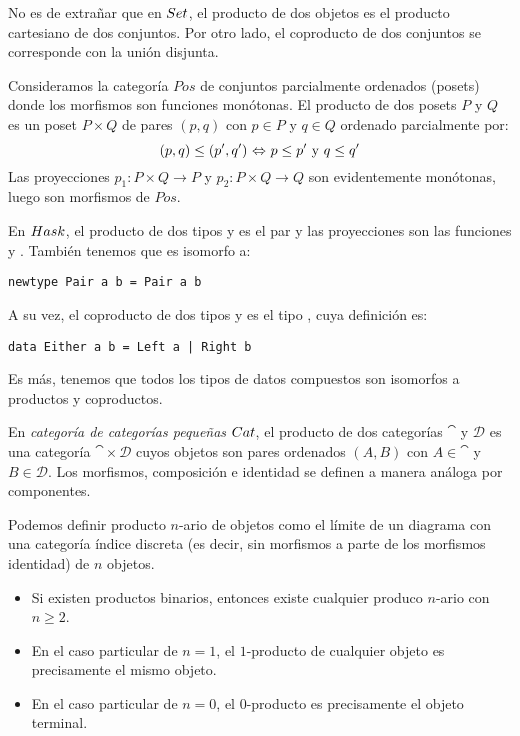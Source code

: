 \begin{example}
No es de extrañar que en ${Set}$, el producto de dos objetos es el producto cartesiano de dos conjuntos.
Por otro lado, el coproducto de dos conjuntos se corresponde con la unión disjunta.
\end{example}

\begin{example}\label{ejemplo-producto-pos}
Consideramos la categoría $Pos$ de conjuntos parcialmente ordenados (posets) donde los morfismos son funciones monótonas.
El producto de dos posets $P$ y $Q$ es un poset $P \times Q$ de pares $(p,q)$ con $p \in P$ y $q \in Q$ ordenado parcialmente por:
\[ (p,q) \leq (p',q') {\ \Leftrightarrow\ } p \leq p' \text{ y }q \leq q' \]
Las proyecciones $p_1 \colon P \times Q \to P$ y $p_2 \colon P \times Q \to Q$ son evidentemente monótonas, luego son morfismos de $Pos$.
\end{example}

\begin{example}
En ${Hask}$, el producto de dos tipos  y  es el par  y las proyecciones son las funciones  y .
También tenemos que  es isomorfo a:
\begin{verbatim}
newtype Pair a b = Pair a b
\end{verbatim}
A su vez, el coproducto de dos tipos  y  es el tipo , cuya definición es:
\begin{verbatim}
data Either a b = Left a | Right b
\end{verbatim}
Es más, tenemos que todos los tipos de datos compuestos son isomorfos a productos y coproductos.
\end{example}

\begin{example}
En \emph{categoría de categorías pequeñas} ${Cat}$, el producto de dos categorías $\cat$ y $\mathcal{D}$ es una categoría $\cat \times \mathcal{D}$ cuyos objetos son pares ordenados $(A,B)$ con $A \in \cat$ y $B \in \mathcal{D}$.
Los morfismos, composición e identidad se definen a manera análoga por componentes.
\end{example}

Podemos definir producto $n$-ario de objetos como el límite de un diagrama con una categoría índice discreta (es decir, sin morfismos a parte de los morfismos identidad) de $n$ objetos.
\begin{remark}\mbox{}
\begin{itemize}
  \item Si existen productos binarios, entonces existe cualquier produco $n$-ario con $n \geq 2$.
  \item En el caso particular de $n=1$, el $1$-producto de cualquier objeto es precisamente el mismo objeto.
  \item En el caso particular de $n=0$, el $0$-producto es precisamente el objeto terminal.
\end{itemize}
\end{remark}

